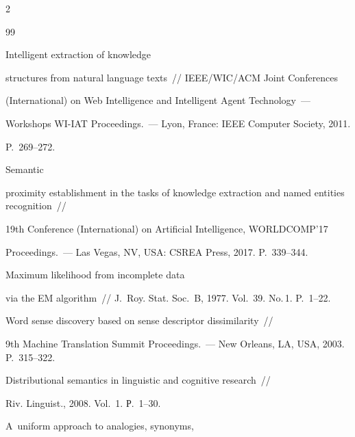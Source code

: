 \begin{multicols}{2}
{{\begin{thebibliography}{99}
     




 Intelligent extraction of knowledge 


structures from natural language texts~// IEEE/WIC/ACM Joint Conferences 


(International) on Web Intelligence and Intelligent Agent Technology~--- 


Workshops WI-IAT Proceedings.~--- Lyon, France: IEEE Computer Society, 2011. 


P.~269--272. 




 Semantic 


proximity establishment in the tasks of knowledge extraction and named entities recognition~// 


19th Conference (International) on Artificial Intelligence, WORLDCOMP'17 


Proceedings.~--- Las Vegas, NV, USA: CSREA Press, 2017. P.~339--344.







 Maximum likelihood from incomplete data 


via the EM algorithm~// J.~Roy. Stat. Soc.~B, 1977. Vol.~39. No.\,1. P.~1--22.







 Word sense discovery based on sense descriptor dissimilarity~//


9th Machine Translation Summit Proceedings.~--- New Orleans, LA, USA, 2003. P.~315--322.







 Distributional semantics in linguistic and cognitive research~// 


Riv. Linguist., 2008. Vol.~1. Р.~1--30.










 A~uniform approach to analogies, synonyms, 



\end{thebibliography}}}
\end{multicols}
